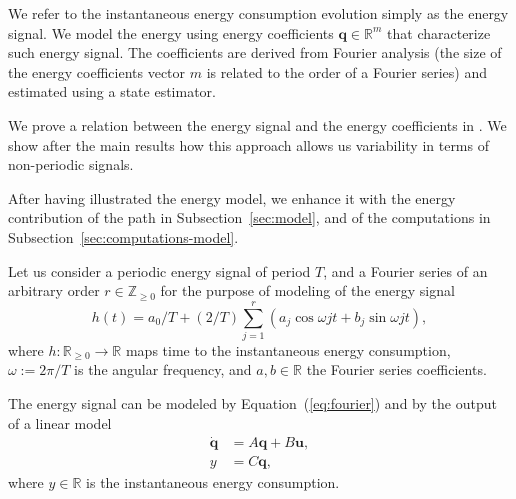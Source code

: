 We refer to the instantaneous energy consumption evolution simply as the energy signal. We model the energy using energy coefficients $\mathbf{q}\in\mathbb{R}^m$ that characterize such energy signal. The coefficients are derived from Fourier analysis (the size of the energy coefficients vector $m$ is related to the order of a Fourier series) and estimated using a state estimator. 

We prove a relation between the energy signal and the energy coefficients in . We show after the main results how this approach allows us variability in terms of non-periodic signals.

After having illustrated the energy model, we enhance it with the energy contribution of the path in Subsection~\ref{sec:model}, and of the computations in Subsection~\ref{sec:computations-model}. 

Let us consider a periodic energy signal of period $T$, and a Fourier series of an arbitrary order $r\in\mathbb{Z}_{\geq 0}$ for the purpose of modeling of the energy signal
\begin{equation}\label{eq:fourier}
  h(t)=a_0/T+(2/T)\sum_{j=1}^{r}{\left(a_j\cos{\omega jt}+b_j\sin{\omega jt}\right)},
\end{equation}
where $h:\mathbb{R}_{\geq 0}\rightarrow\mathbb{R}$ maps time to the instantaneous energy consumption, $\omega:=2\pi/T$ is the angular frequency, and $a,b\in\mathbb{R}$ the Fourier series coefficients.

The energy signal can be modeled by Equation~(\ref{eq:fourier}) and by the output of a linear model
\begin{equation}\label{eq:state-perf}\begin{split}
  \dot{\mathbf{q}}&=A\mathbf{q}+B\mathbf{u},\\
  y&=C\mathbf{q},
\end{split}\end{equation}
where $y\in\mathbb{R}$ is the instantaneous energy consumption. 

